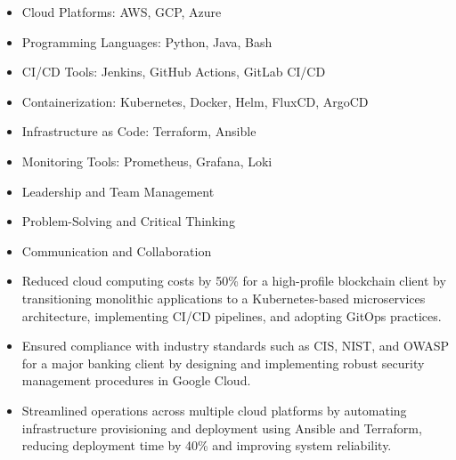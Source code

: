 \documentclass[11pt, a4paper]{awesome-cv}
\begin{document}
\begin{cvparagraph}
{\scriptsize
    \begin{minipage}[t]{0.33\textwidth}
        \begin{itemize}
            \item Cloud Platforms: AWS, GCP, Azure
            \item Programming Languages: Python, Java, Bash
            \item CI/CD Tools: Jenkins, GitHub Actions, GitLab CI/CD
        \end{itemize}
    \end{minipage}
    \begin{minipage}[t]{0.33\textwidth}
        \begin{itemize}
            \item Containerization: Kubernetes, Docker, Helm, FluxCD, ArgoCD
            \item Infrastructure as Code: Terraform, Ansible
            \item Monitoring Tools: Prometheus, Grafana, Loki
        \end{itemize}
    \end{minipage}
    \begin{minipage}[t]{0.33\textwidth}
        \begin{itemize}
            \item Leadership and Team Management
            \item Problem-Solving and Critical Thinking
            \item Communication and Collaboration
        \end{itemize}
    \end{minipage}
}
\end{cvparagraph}

\vspace{-10pt}

\begin{cvparagraph}
\begin{itemize}
    \item Reduced cloud computing costs by 50\% for a high-profile blockchain client by transitioning monolithic applications to a Kubernetes-based microservices architecture, implementing CI/CD pipelines, and adopting GitOps practices.
    \item Ensured compliance with industry standards such as CIS, NIST, and OWASP for a major banking client by designing and implementing robust security management procedures in Google Cloud.
    \item Streamlined operations across multiple cloud platforms by automating infrastructure provisioning and deployment using Ansible and Terraform, reducing deployment time by 40\% and improving system reliability.
\end{itemize}
\end{cvparagraph}
\end{document}
